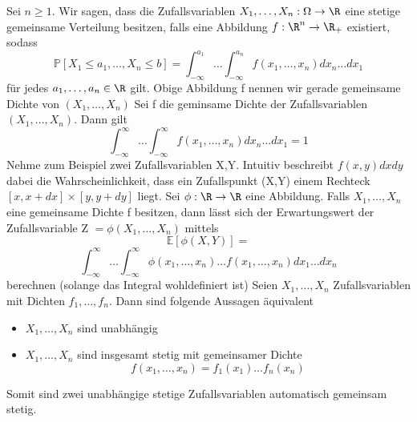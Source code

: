 \Def[5.7] \newline
Sei \( n \geq 1\). Wir sagen, dass die Zufallsvariablen \(X_1 , \dots , X_n : \Omega \rightarrow \R \) eine stetige gemeinsame Verteilung besitzen, falls eine Abbildung \( f: \R^n \rightarrow \R_+ \) existiert, sodass \[ \mathbb{P}[X_1 \leq a_1, \dots , X_n \leq b] = \int_{-\infty}^{a_1} \dots \int_{-\infty}^{a_n} f(x_1, \dots , x_n) dx_n \dots dx_1\]
für jedes  \( a_1 , \dots , a_n \in \R \) gilt. Obige Abbildung f nennen wir gerade gemeinsame Dichte von \((X_1, \dots , X_n)\)
\Satz[5.9] \newline
Sei f die geminsame Dichte der Zufallsvariablen \((X_1, \dots , X_n)\). Dann gilt \[ \int_{-\infty}^\infty \dots \int_{-\infty}^\infty f(x_1, \dots , x_n )dx_n \dots dx_1 = 1\]
\Bem[5.9a] \newline
Nehme zum Beispiel zwei Zufallsvariablen X,Y. Intuitiv beschreibt \(f(x,y)dxdy\) dabei die Wahrscheinlichkeit, dass ein Zufallspunkt (X,Y) einem Rechteck \([x, x + dx] \times [y,y + dy]\) liegt.
\Satz[5.10] \newline
Sei \( \phi: \R \rightarrow \R \) eine Abbildung. Falls \( X_1, \dots , X_n\) eine gemeinsame Dichte f besitzen, dann lässt sich der Erwartungswert der Zufallsvariable Z \( = \phi (X_1, \dots , X_n )\) mittels \[ \mathbb{E}[\phi(X,Y)] = \] \[\int_{-\infty}^\infty \dots \int_{-\infty}^\infty \phi(x_1 , \dots , x_n) \dots f(x_1, \dots , x_n) dx_1 \dots dx_n\]
berechnen (solange das Integral wohldefiniert ist)
\Theo[5.11] \newline
Seien \(X_1, \dots , X_n \) Zufallsvariablen mit Dichten \(f_1, \dots , f_n\). Dann sind folgende Aussagen äquivalent
\begin{itemize}
    \item \(X_1, \dots , X_n \) sind unabhängig
    \item \(X_1, \dots , X_n \) sind insgesamt stetig mit gemeinsamer Dichte \[f(x_1, \dots , x_n) = f_1(x_1) \dots f_n(x_n)\]
\end{itemize}
\Bem[5.12] \newline
Somit sind zwei unabhängige stetige Zufallsvariablen automatisch gemeinsam stetig.


